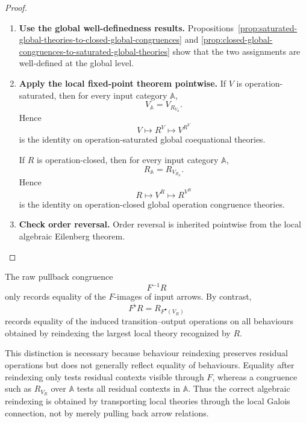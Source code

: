 \begin{proof}
    \leavevmode
    \begin{enumerate}
        \item \textbf{Use the global well-definedness results.}
        Propositions~\ref{prop:saturated-global-theories-to-closed-global-congruences}
        and
        \ref{prop:closed-global-congruences-to-saturated-global-theories}
        show that the two assignments are well-defined at the global level.

        \item \textbf{Apply the local fixed-point theorem pointwise.}
        If \(V\) is operation-saturated, then for every input category
        \(\mathbb A\),
        \[
            V_{\mathbb A}=V_{R_{V_{\mathbb A}}}.
        \]
        Hence
        \[
            V\longmapsto R^V\longmapsto V^{R^V}
        \]
        is the identity on operation-saturated global coequational theories.

        If \(R\) is operation-closed, then for every input category
        \(\mathbb A\),
        \[
            R_{\mathbb A}=R_{V_{R_{\mathbb A}}}.
        \]
        Hence
        \[
            R\longmapsto V^R\longmapsto R^{V^R}
        \]
        is the identity on operation-closed global operation congruence
        theories.

        \item \textbf{Check order reversal.}
        Order reversal is inherited pointwise from the local algebraic
        Eilenberg theorem.
    \end{enumerate}
\end{proof}

\begin{remark}
\label{rem:why-Fflat-not-raw-pullback}
    The raw pullback congruence
    \[
        F^{-1}R
    \]
    only records equality of the \(F\)-images of input arrows. By contrast,
    \[
        F^\flat R
        =
        R_{F^\bullet(V_R)}
    \]
    records equality of the induced transition--output operations on all
    behaviours obtained by reindexing the largest local theory recognized by
    \(R\).

    This distinction is necessary because behaviour reindexing preserves
    residual operations but does not generally reflect equality of behaviours.
    Equality after reindexing only tests residual contexts visible through
    \(F\), whereas a congruence such as \(R_{V_R}\) over \(\mathbb A\) tests all
    residual contexts in \(\mathbb A\). Thus the correct algebraic reindexing is
    obtained by transporting local theories through the local Galois connection,
    not by merely pulling back arrow relations.
\end{remark}

